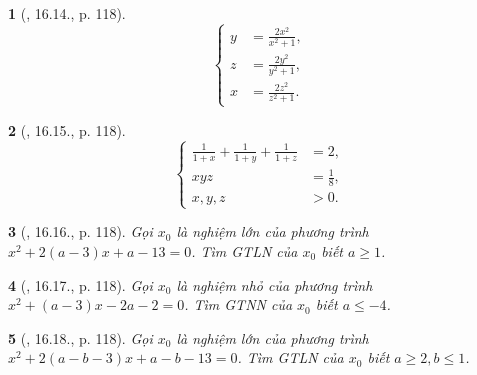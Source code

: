 \documentclass{article}
\newtheorem{baitoan}{}
\begin{document}
\begin{baitoan}[\cite{TLCT_THCS_Toan_9_dai_so}, 16.14., p. 118]
	\begin{equation*}
		\left\{\begin{split}
			y &= \frac{2x^2}{x^2 + 1},\\
			z &= \frac{2y^2}{y^2 + 1},\\
			x &= \frac{2z^2}{z^2 + 1}.
		\end{split}\right.
	\end{equation*}
\end{baitoan}

\begin{baitoan}[\cite{TLCT_THCS_Toan_9_dai_so}, 16.15., p. 118]
	\begin{equation*}
		\left\{\begin{split}
			\frac{1}{1 + x} + \frac{1}{1 + y} + \frac{1}{1 + z} &= 2,\\
			xyz &= \frac{1}{8},\\
			x,y,z &> 0.
		\end{split}\right.
	\end{equation*}
\end{baitoan}

\begin{baitoan}[\cite{TLCT_THCS_Toan_9_dai_so}, 16.16., p. 118]
	Gọi $x_0$ là nghiệm lớn của phương trình $x^2 + 2(a - 3)x + a - 13 = 0$. Tìm {\rm GTLN} của $x_0$ biết $a\ge1$.
\end{baitoan}

\begin{baitoan}[\cite{TLCT_THCS_Toan_9_dai_so}, 16.17., p. 118]
	Gọi $x_0$ là nghiệm nhỏ của phương trình $x^2 + (a - 3)x - 2a - 2 = 0$. Tìm {\rm GTNN} của $x_0$ biết $a\le-4$.
\end{baitoan}

\begin{baitoan}[\cite{TLCT_THCS_Toan_9_dai_so}, 16.18., p. 118]
	Gọi $x_0$ là nghiệm lớn của phương trình $x^2 + 2(a - b - 3)x + a - b - 13 = 0$. Tìm {\rm GTLN} của $x_0$ biết $a\ge2,b\le1$.
\end{baitoan}


\printbibliography[heading=bibintoc]
	
\end{document}
